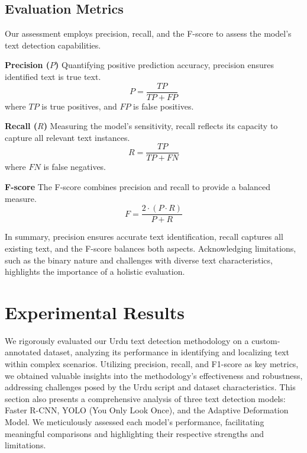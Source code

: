 \documentclass[default,iicol]{sn-jnl}%
\begin{document}
\subsection{Evaluation Metrics}

Our assessment employs precision, recall, and the F-score to assess the model's text detection capabilities.

\textbf{Precision (\(P\))}
Quantifying positive prediction accuracy, precision ensures identified text is true text. 
\begin{equation}
	P = \frac{TP}{TP + FP}
\end{equation} 
where \( TP \) is true positives, and \( FP \) is false positives.

\textbf{Recall (\(R\))}
Measuring the model's sensitivity, recall reflects its capacity to capture all relevant text instances.
\begin{equation}
	R = \frac{TP}{TP + FN}
\end{equation}
where \( FN \) is false negatives.
 
\textbf{F-score}
The F-score combines precision and recall to provide a balanced measure. 
\begin{equation}
	F = \frac{2 \cdot (P \cdot R)}{P + R}
\end{equation}

In summary, precision ensures accurate text identification, recall captures all existing text, and the F-score balances both aspects. Acknowledging limitations, such as the binary nature and challenges with diverse text characteristics, highlights the importance of a holistic evaluation.


\section{Experimental Results}
We rigorously evaluated our Urdu text detection methodology on a custom-annotated dataset, analyzing its performance in identifying and localizing text within complex scenarios. Utilizing precision, recall, and F1-score as key metrics, we obtained valuable insights into the methodology's effectiveness and robustness, addressing challenges posed by the Urdu script and dataset characteristics. This section also presents a comprehensive analysis of three text detection models: Faster R-CNN, YOLO (You Only Look Once), and the Adaptive Deformation Model. We meticulously assessed each model's performance, facilitating meaningful comparisons and highlighting their respective strengths and limitations.
\end{document}

